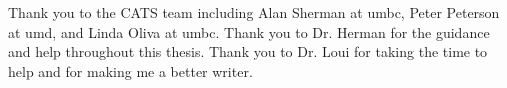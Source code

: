 Thank you to the CATS team including Alan Sherman at \gls{umbc}, Peter Peterson at \gls{umd}, and Linda Oliva at \gls{umbc}. Thank you to Dr. Herman for the guidance and help throughout this thesis. Thank you to Dr. Loui for taking the time to help and for making me a better writer.
